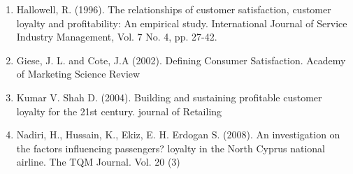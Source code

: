 \documentclass[a4paper, 14pt]{article}
\begin{document}
{\begin{enumerate}
\item Hallowell, R. (1996). The relationships of customer satisfaction, customer loyalty and profitability: An empirical study. International Journal of Service Industry Management, Vol. 7 No. 4, pp. 27-42.
\item Giese, J. L. and Cote, J.A (2002). Defining Consumer Satisfaction. Academy of Marketing Science Review
\item Kumar V. Shah D. (2004). Building and sustaining profitable customer loyalty for the 21st century. journal of Retailing
\item Nadiri, H., Hussain, K., Ekiz, E. H. Erdogan S. (2008). An investigation on the factors influencing passengers? loyalty in the North Cyprus national airline. The TQM Journal. Vol. 20 (3)

\end{enumerate}
}
\end{document}
